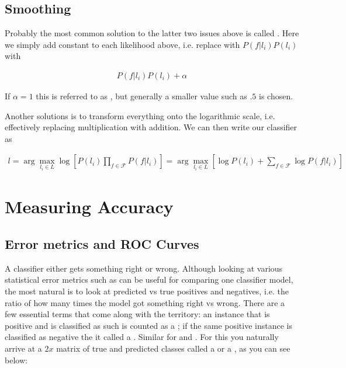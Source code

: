 \subsection{Smoothing}

Probably the most common solution to the latter two issues above is called . Here we simply add constant to each likelihood above, i.e. replace with $P(f|l_i)P(l_i)$ with

\begin{align*}
P(f|l_i)P(l_i) + \alpha
\end{align*}

If $\alpha=1$ this is referred to as , but generally a smaller value such as $.5$ is chosen. 

Another solutions is to transform everything onto the logarithmic scale, i.e. effectively replacing multiplication with addition. We can then write our classifier as 

\begin{align*}
    l = \arg \max_{l_i \in L} \log [P(l_i) \prod_{f \in \mathcal{F}} P(f|l_i)] = 
    \arg \max_{l_i \in L}  [\log P(l_i) + \sum_{f \in \mathcal{F}} \log P(f|l_i)] 
\end{align*}


\vspace{15mm}
\section{Measuring Accuracy}

\subsection{Error metrics and ROC Curves}
\label{classification:subsection:roc}


A classifier either gets something right or wrong. Although looking at various statistical error metrics such as  can be useful for comparing one classifier model, the most natural is to look at predicted vs true positives and negatives, i.e. the ratio of how many times the model got something right vs wrong. There are a few essential terms that come along with the territory: an instance that is positive and is classified as such is counted as a ; if the same positive instance is classified as negative the it called a . Similar for  and . For this you naturally arrive at a $2x$ matrix of true and predicted classes called a  or a , as you can see below:

